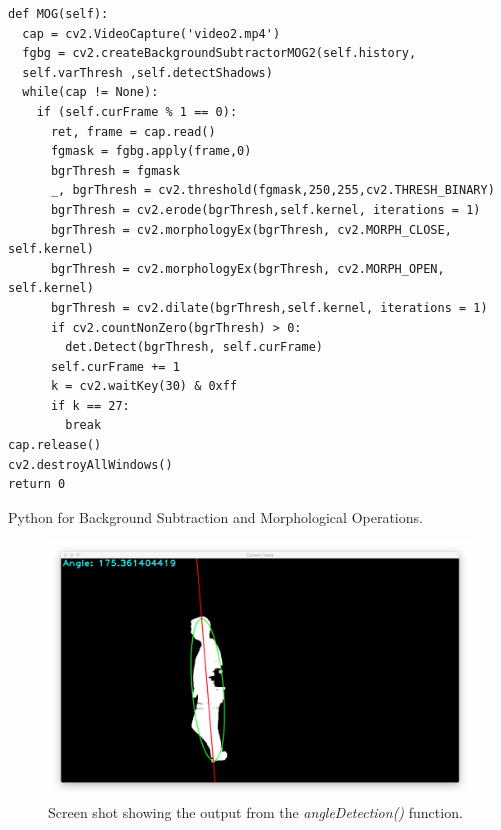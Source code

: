 \documentclass[11pt,a4paper]{report}
\begin{document}
\begin{listing}
\begin{verbatim}
def MOG(self):
  cap = cv2.VideoCapture('video2.mp4')
  fgbg = cv2.createBackgroundSubtractorMOG2(self.history, 
  self.varThresh ,self.detectShadows)
  while(cap != None):
    if (self.curFrame % 1 == 0):
      ret, frame = cap.read()
      fgmask = fgbg.apply(frame,0)
      bgrThresh = fgmask
      _, bgrThresh = cv2.threshold(fgmask,250,255,cv2.THRESH_BINARY)
      bgrThresh = cv2.erode(bgrThresh,self.kernel, iterations = 1)
      bgrThresh = cv2.morphologyEx(bgrThresh, cv2.MORPH_CLOSE, self.kernel)
      bgrThresh = cv2.morphologyEx(bgrThresh, cv2.MORPH_OPEN, self.kernel)
      bgrThresh = cv2.dilate(bgrThresh,self.kernel, iterations = 1)
      if cv2.countNonZero(bgrThresh) > 0:
      	det.Detect(bgrThresh, self.curFrame)
      self.curFrame += 1
      k = cv2.waitKey(30) & 0xff
      if k == 27:
      	break
cap.release()
cv2.destroyAllWindows()
return 0
\end{verbatim}
\caption{Python for Background Subtraction and Morphological Operations.}
\label{bgSubPython}
\end{listing}

\begin{figure}[H]
 \centering
 \includegraphics[scale = 0.22]{angleExample.png}
 \caption{Screen shot showing the output from the \textit{angleDetection()} function.}
 \label{fig:angleDetectionExample}
\end{figure}
\end{document}
